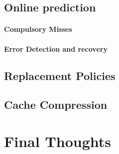 \subsection{Online prediction}
\paragraph{Compulsory Misses}
\paragraph{Error Detection and recovery}
\subsection{Replacement Policies}
\subsection{Cache Compression}
\section{Final Thoughts}